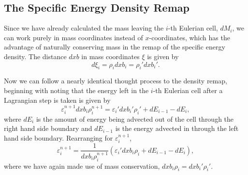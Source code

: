 \subsection{The Specific Energy Density Remap}
Since we have already calculated the mass leaving the $i$-th Eulerian cell, $dM_i$, we can work purely in mass coordinates instead of $x$-coordinates, which has the advantage of naturally conserving mass in the remap of the specific energy density. The distance $dxb$ in mass coordinates $\xi$ is given by
\begin{equation}
  d\xi_i = \rho_i dxb_i = \rho_i' dxb_i'.
\end{equation}

Now we can follow a nearly identical thought process to the density remap, beginning with noting that the energy left in the $i$-th Eulerian cell after a Lagrangian step is taken is given by
\begin{equation}
  \varepsilon_i^{n+1} dxb_i \rho_i^{n+1} = \varepsilon_i' dxb_i' \rho_i' + dE_{i-1} - dE_i,
\end{equation}
where $dE_i$ is the amount of energy being advected out of the cell through the right hand side boundary and $dE_{i-1}$ is the energy advected in through the left hand side boundary. Rearranging for $\varepsilon_i^{n+1}$, 
\begin{equation}
  \varepsilon_i^{n+1}  = \frac{1}{dxb_i \rho_i^{n+1}}(\varepsilon_i' dxb_i \rho_i + dE_{i-1} - dE_i),
  \label{eqn-remap-specific-energy-density}
\end{equation}
where we have again made use of mass conservation, $dxb_i \rho_i = dxb_i' \rho_i'$.

